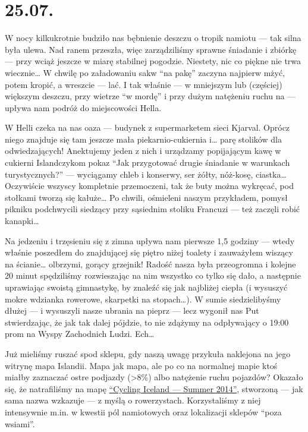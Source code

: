 \chapter*{25.07.}

W nocy kilkukrotnie budziło nas bębnienie deszczu o tropik namiotu --- tak silna była ulewa. Nad ranem przeszła, więc zarządziliśmy sprawne śniadanie i zbiórkę --- przy wciąż jeszcze w miarę stabilnej pogodzie. Niestety, nic co piękne nie trwa wiecznie… W chwilę po załadowaniu sakw “na pakę” zaczyna najpierw mżyć, potem kropić, a wreszcie --- lać. I tak właśnie --- w mniejszym lub (częściej) większym deszczu, przy wietrze “w mordę” i przy dużym natężeniu ruchu na  --- upływa nam podróż do miejscowości Hella.

W Helli czeka na nas oaza --- budynek z supermarketem sieci Kjarval. Oprócz niego znajduje się tam jeszcze mała piekarnio-cukiernia i… parę stolików dla odwiedzających! Anektujemy jeden z nich i urządzamy popijającym kawę w cukierni Islandczykom pokaz “Jak przygotować drugie śniadanie w warunkach turystycznych?” --- wyciągamy chleb i konserwy, ser żółty, nóż-kosę, ciastka… Oczywiście wszyscy kompletnie przemoczeni, tak że buty można wykręcać, pod stołkami tworzą się kałuże… Po chwili, ośmieleni naszym przykładem, pomysł pikniku podchwycili siedzący przy sąsiednim stoliku Francuzi --- też zaczęli robić kanapki…

Na jedzeniu i trzęsieniu się z zimna upływa nam pierwsze 1,5 godziny --- wtedy właśnie poszedłem do znajdującej się piętro niżej toalety i zauważyłem wiszący na ścianie… olbrzymi, gorący grzejnik! Radość nasza była przeogromna i kolejne 20 minut spędziliśmy rozwieszając na nim wszystko co tylko się dało, a następnie uprawiając swoistą gimnastykę, by znaleźć się jak najbliżej ciepła (i wysuszyć mokre wdzianka rowerowe, skarpetki na stopach…). W sumie siedzielibyśmy dłużej --- i wysuszyli nasze ubrania na pieprz --- lecz wygonił nas Put stwierdzając, że jak tak dalej pójdzie, to nie zdążymy na odpływający o 19:00 prom na Wyspy Zachodnich Ludzi. Ech…


Już mieliśmy ruszać spod sklepu, gdy naszą uwagę przykuła naklejona na jego witrynę mapa Islandii. Mapa jak mapa, ale po co na normalnej mapie ktoś miałby zaznaczać ostre podjazdy (>8\%) albo natężenie ruchu pojazdów? Okazało się, że natrafiliśmy na mapę \href{http://www.vegagerdin.is/media/upplysingar-og-utgafa/Cycling-map.pdf}{“Cycling Iceland --- Summer 2014”}, stworzoną --- jak sama nazwa wzkazuje --- z myślą o rowerzystach. Korzystaliśmy z niej intensywnie m.in. w kwestii pól namiotowych oraz lokalizacji sklepów “poza wsiami”.


